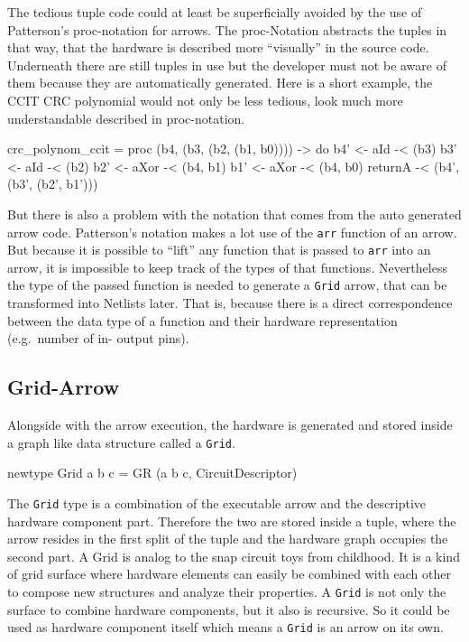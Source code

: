 \documentclass[9pt,final,a4paper,leqno]{article}
\newcommand{\hs}[1]{\mbox{\lstinline[basicstyle=\color{textgray}]!#1!}}
\begin{document}
\par
The tedious tuple code could at least be superficially avoided by the use of Patterson's proc-notation for arrows.
\cite{PatersonNewNotation} The proc-Notation abstracts the tuples in that way, that the hardware is described more ``visually'' in the
source code. Underneath there are still tuples in use but the developer must not be aware of them because they are automatically generated.
Here is a short example, the CCIT CRC polynomial would not only be less tedious, look much more understandable described in proc-notation. 
\begin{haskell}
crc_polynom_ccit 
 = proc (b4, (b3, (b2, (b1, b0)))) -> do
     b4' <- aId  -< (b3)
     b3' <- aId  -< (b2)
     b2' <- aXor -< (b4, b1)
     b1' <- aXor -< (b4, b0)
     returnA     -< (b4', (b3', (b2', b1')))
\end{haskell} 

\par
But there is also a problem with the notation that comes from the auto generated arrow code. Patterson's notation makes a lot use of the
\hs{arr} function of an arrow. But because it is possible to ``lift'' any function that is passed to \hs{arr} into an arrow, it is
impossible to keep track of the types of that functions. Nevertheless the type of the passed function is needed to generate a \hs{Grid}
arrow, that can be transformed into Netlists later. That is, because there is a direct correspondence between the data type of a function
and their hardware representation (e.g.\ number of in- output pins).

\subsection{Grid-Arrow}
Alongside with the arrow execution, the hardware is generated and stored inside a graph like data structure called a \hs{Grid}.
\begin{haskell}
  newtype Grid a b c = GR (a b c, CircuitDescriptor)
\end{haskell} 
The \hs{Grid} type is a combination of the executable arrow and the descriptive hardware component part. Therefore the two are stored inside
a tuple, where the arrow resides in the first split of the tuple and the hardware graph occupies the second part. A Grid is analog to the
snap circuit toys from childhood. It is a kind of grid surface where hardware elements can easily be combined with each other to compose new
structures and analyze their properties. A \hs{Grid} is not only the surface to combine hardware components, but it also is recursive. So
it could be used as hardware component itself which means a \hs{Grid} is an arrow on its own. 
\end{document}
